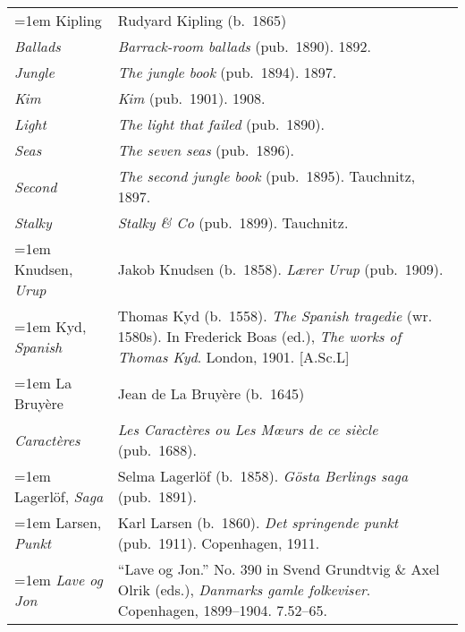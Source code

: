 \begin{xltabular}{\textwidth}{ lQ }
\hangindent=1em  Kipling & Rudyard Kipling (b.~1865) \\
\hspace{1em}\textit{Ballads} & \textit{Barrack-room ballads} (pub.~1890). 1892. \\
\hspace{1em}\textit{Jungle} & \textit{The jungle book} (pub.~1894). 1897. \\
\hspace{1em}\textit{Kim} & \textit{Kim} (pub.~1901). 1908. \\
\hspace{1em}\textit{Light} & \textit{The light that failed} (pub.~1890). \\
\hspace{1em}\textit{Seas} & \textit{The seven seas} (pub.~1896). \\
\hspace{1em}\textit{Second} & \textit{The second jungle book} (pub.~1895). Tauchnitz, 1897. \\
\hspace{1em}\textit{Stalky} & \textit{Stalky \& Co} (pub.~1899). Tauchnitz.  \\

\hangindent=1em  Knudsen, \textit{Urup} & Jakob Knudsen (b.~1858). \textit{Lærer Urup} (pub.~1909). \\

\hangindent=1em  Kyd, \textit{Spanish} & Thomas Kyd (b.~1558). \textit{The Spanish tragedie} (wr. 1580s). In Frederick Boas (ed.), \textit{The works of Thomas Kyd}. London, 1901. [A.Sc.L] \\

\hangindent=1em  La Bruyère & Jean de La Bruyère (b.~1645)\\
\hspace{1em}\textit{Caractères} & \textit{Les Caractères ou Les Mœurs de ce siècle} (pub.~1688). \\

\hangindent=1em  Lagerlöf, \textit{Saga} & Selma Lagerlöf (b.~1858). \textit{Gösta Berlings saga} (pub.~1891). \\

\hangindent=1em  Larsen, \textit{Punkt} & Karl Larsen (b.~1860). \textit{Det springende punkt} (pub.~1911). Copenhagen, 1911.\\

\hangindent=1em  \textit{Lave og Jon} & ``Lave og Jon.'' No. 390 in Svend Grundtvig \& Axel Olrik (eds.), \textit{Danmarks gamle folkeviser}. Copenhagen, 1899--1904. 7.52--65. \\


\end{xltabular}
